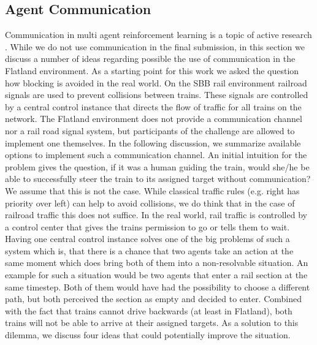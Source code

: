 \subsection*{Agent Communication}\label{agent_communication}
Communication in multi agent reinforcement learning is a topic of active research \cite{marlsurvey}. While we do not use communication in the final submission, in this section we discuss a number of ideas regarding possible the use of communication in the Flatland environment. As a starting point for this work we asked the question how blocking is avoided in the real world. On the SBB rail environment railroad signals are used to prevent collisions between trains. These signals are controlled by a central control instance that directs the flow of traffic for all trains on the network.
The Flatland environment does not provide a communication channel nor a rail road signal system, but participants of the challenge are allowed to implement one themselves. In the following discussion, we summarize available options to implement such a communication channel. An initial intuition for the problem gives the question, if it was a human guiding the train, would she/he be able to successfully steer the train to its assigned target without communication?
We assume that this is not the case. While classical traffic rules (e.g. right has priority over left) can help to avoid collisions, we do think that in the case of railroad traffic this does not suffice. In the real world, rail traffic is controlled by a control center that gives the trains permission to go or tells them to wait. Having one central control instance solves one of the big problems of such a system which is, that there is a chance that two agents take an action at the same moment which does bring both of them into a non-resolvable situation. An example for such a situation would be two agents that enter a rail section at the same timestep. Both of them would have had the possibility to choose a different path, but both perceived the section as empty and decided to enter. Combined with the fact that trains cannot drive backwards (at least in Flatland), both trains will not be able to arrive at their assigned targets. As a solution to this dilemma, we discuss four ideas that could potentially improve the situation.
